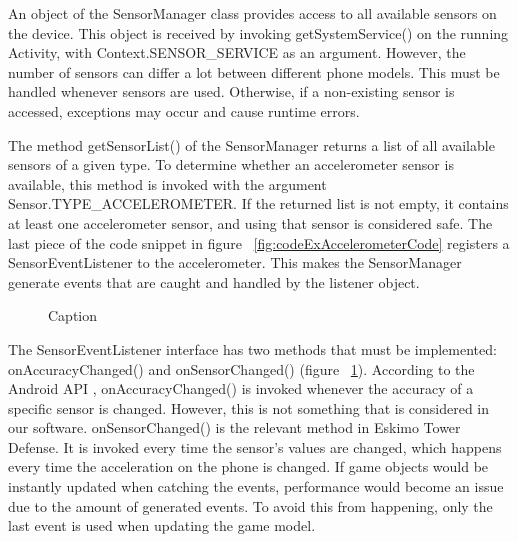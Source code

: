 An object of the SensorManager class provides access to all available sensors on the device. This object is received by invoking getSystemService() on the running Activity, with Context.SENSOR\_SERVICE as an argument. However, the number of sensors can differ a lot between different phone models. This must be handled whenever sensors are used. Otherwise, if a non-existing sensor is accessed, exceptions may occur and cause runtime errors.
 
The method getSensorList() of the SensorManager returns a list of all available sensors of a given type. To determine whether an accelerometer sensor is available, this method is invoked with the argument Sensor.TYPE\_ACCELEROMETER. If the returned list is not empty, it contains at least one accelerometer sensor, and using that sensor is considered safe. The last piece of the code snippet in figure ~\ref{fig:codeExAccelerometerCode} registers a SensorEventListener to the accelerometer. This makes the SensorManager generate events that are caught and handled by the listener object.

\begin{figure}[htb]

\begin{small}

\end{small}

\caption{Caption}
\label{fig:codeExAccelerometerSensorEvent}

\end{figure}

The SensorEventListener interface has two methods that must be implemented: onAccuracyChanged() and onSensorChanged() (figure ~\ref{fig:codeExAccelerometerSensorEvent}). According to the Android API \citep{Android}, onAccuracyChanged() is invoked whenever the accuracy of a specific sensor is changed. However, this is not something that is considered in our software. onSensorChanged() is the relevant method in Eskimo Tower Defense. It is invoked every time the sensor's values are changed, which happens every time the acceleration on the phone is changed. If game objects would be instantly updated when catching the events, performance would become an issue due to the amount of generated events. To avoid this from happening, only the last event is used when updating the game model.